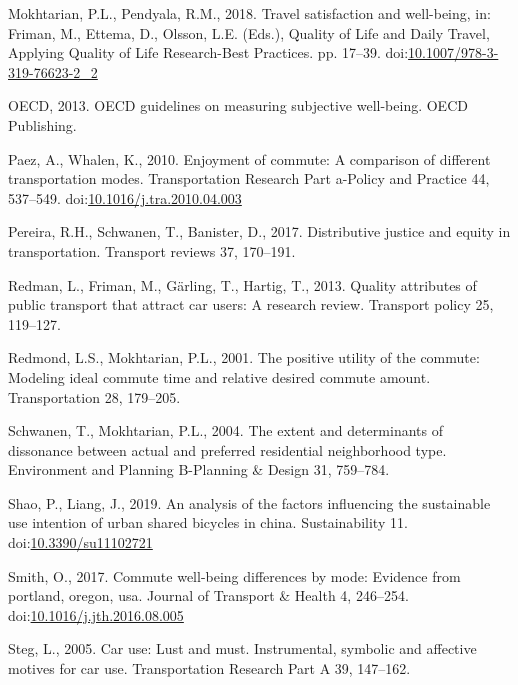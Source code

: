 \documentclass[]{elsarticle} %
\begin{document}
\leavevmode\hypertarget{ref-Mokhtarian2018travel}{}%
Mokhtarian, P.L., Pendyala, R.M., 2018. Travel satisfaction and
well-being, in: Friman, M., Ettema, D., Olsson, L.E. (Eds.), Quality of
Life and Daily Travel, Applying Quality of Life Research-Best Practices.
pp. 17--39.
doi:\href{https://doi.org/10.1007/978-3-319-76623-2_2}{10.1007/978-3-319-76623-2\_2}

\leavevmode\hypertarget{ref-oecd2013oecd}{}%
OECD, 2013. OECD guidelines on measuring subjective well-being. OECD
Publishing.

\leavevmode\hypertarget{ref-Paez2010enjoyment}{}%
Paez, A., Whalen, K., 2010. Enjoyment of commute: A comparison of
different transportation modes. Transportation Research Part a-Policy
and Practice 44, 537--549.
doi:\href{https://doi.org/10.1016/j.tra.2010.04.003}{10.1016/j.tra.2010.04.003}

\leavevmode\hypertarget{ref-Pereira2017distributive}{}%
Pereira, R.H., Schwanen, T., Banister, D., 2017. Distributive justice
and equity in transportation. Transport reviews 37, 170--191.

\leavevmode\hypertarget{ref-Redman2013quality}{}%
Redman, L., Friman, M., Gärling, T., Hartig, T., 2013. Quality
attributes of public transport that attract car users: A research
review. Transport policy 25, 119--127.

\leavevmode\hypertarget{ref-Redmond2001positive}{}%
Redmond, L.S., Mokhtarian, P.L., 2001. The positive utility of the
commute: Modeling ideal commute time and relative desired commute
amount. Transportation 28, 179--205.

\leavevmode\hypertarget{ref-Schwanen2004extent}{}%
Schwanen, T., Mokhtarian, P.L., 2004. The extent and determinants of
dissonance between actual and preferred residential neighborhood type.
Environment and Planning B-Planning \& Design 31, 759--784.

\leavevmode\hypertarget{ref-Shao2019analysis}{}%
Shao, P., Liang, J., 2019. An analysis of the factors influencing the
sustainable use intention of urban shared bicycles in china.
Sustainability 11.
doi:\href{https://doi.org/10.3390/su11102721}{10.3390/su11102721}

\leavevmode\hypertarget{ref-Smith2017commute}{}%
Smith, O., 2017. Commute well-being differences by mode: Evidence from
portland, oregon, usa. Journal of Transport \& Health 4, 246--254.
doi:\href{https://doi.org/10.1016/j.jth.2016.08.005}{10.1016/j.jth.2016.08.005}

\leavevmode\hypertarget{ref-Steg2005car}{}%
Steg, L., 2005. Car use: Lust and must. Instrumental, symbolic and
affective motives for car use. Transportation Research Part A 39,
147--162.
\end{document}
